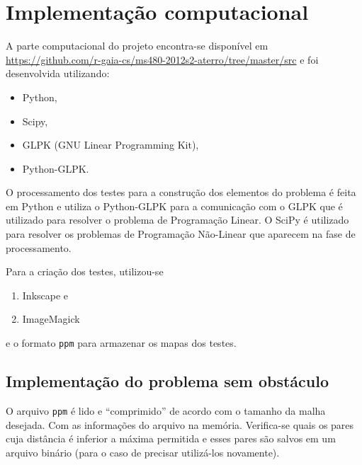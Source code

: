 %
%
%

\section{Implementa\c{c}\~{a}o computacional}
A parte computacional do projeto encontra-se disponível em
\url{https://github.com/r-gaia-cs/ms480-2012s2-aterro/tree/master/src} e foi
desenvolvida utilizando:
\begin{itemize}
    \item Python\nocite{Python},
    \item Scipy\nocite{SciPy},
    \item GLPK (GNU Linear Programming Kit)\nocite{GLPK},
    \item Python-GLPK.
\end{itemize}
O processamento dos testes para a construção dos elementos do problema é feita
em Python e utiliza o Python-GLPK para a comunicação com o GLPK que é utilizado
para resolver o problema de Programação Linear. O SciPy é utilizado para
resolver os problemas de Programação Não-Linear que aparecem na fase de
processamento.

Para a criação dos testes, utilizou-se
\begin{enumerate}
    \item Inkscape e
    \item ImageMagick
\end{enumerate}
e o formato \texttt{ppm} para armazenar os mapas dos testes.

\subsection{Implementação do problema sem obstáculo}
O arquivo \texttt{ppm} é lido e ``comprimido'' de acordo com o tamanho da malha
desejada. Com as informações do arquivo na memória. Verifica-se quais os pares
cuja distância é inferior a máxima permitida e esses pares são salvos em um
arquivo binário (para o caso de precisar utilizá-los novamente).

